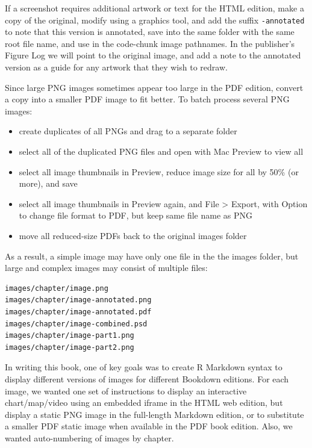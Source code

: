 \documentclass[
  english,
]{book}
\providecommand{\tightlist}{%
  \setlength{\itemsep}{0pt}\setlength{\parskip}{0pt}}
\begin{document}
If a screenshot requires additional artwork or text for the HTML edition, make a copy of the original, modify using a graphics tool, and add the suffix \texttt{-annotated} to note that this version is annotated, save into the same folder with the same root file name, and use in the code-chunk image pathnames. In the publisher's Figure Log we will point to the original image, and add a note to the annotated version as a guide for any artwork that they wish to redraw.

Since large PNG images sometimes appear too large in the PDF edition, convert a copy into a smaller PDF image to fit better. To batch process several PNG images:

\begin{itemize}
\tightlist
\item
  create duplicates of all PNGs and drag to a separate folder
\item
  select all of the duplicated PNG files and open with Mac Preview to view all
\item
  select all image thumbnails in Preview, reduce image size for all by 50\% (or more), and save
\item
  select all image thumbnails in Preview again, and File \textgreater{} Export, with Option to change file format to PDF, but keep same file name as PNG
\item
  move all reduced-size PDFs back to the original images folder
\end{itemize}

As a result, a simple image may have only one file in the the images folder, but large and complex images may consist of multiple files:

\begin{verbatim}
images/chapter/image.png
images/chapter/image-annotated.png
images/chapter/image-annotated.pdf
images/chapter/image-combined.psd
images/chapter/image-part1.png
images/chapter/image-part2.png
\end{verbatim}

In writing this book, one of key goals was to create R Markdown syntax to display different versions of images for different Bookdown editions. For each image, we wanted one set of instructions to display an interactive chart/map/video using an embedded iframe in the HTML web edition, but display a static PNG image in the full-length Markdown edition, or to substitute a smaller PDF static image when available in the PDF book edition. Also, we wanted auto-numbering of images by chapter.
\end{document}
